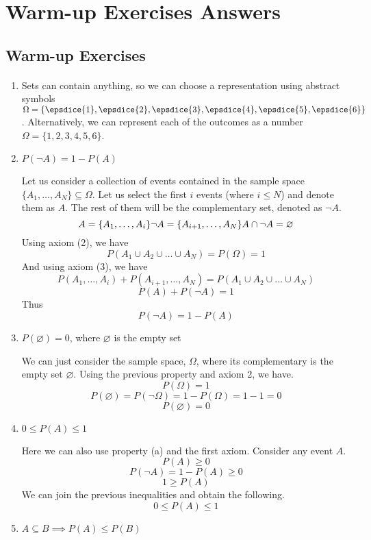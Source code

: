 \section{Warm-up Exercises Answers}
\subsection{Warm-up Exercises}
\paragraph{}
\begin{enumerate}[label=\alph*.]
    \item Sets can contain anything, so we can choose a representation using abstract symbols $\Omega=\{ \epsdice{1}, \epsdice{2}, \epsdice{3}, \epsdice{4}, \epsdice{5}, \epsdice{6} \}$. Alternatively, we can represent each of the outcomes as a number $\Omega = \{1, 2, 3, 4, 5, 6\}$. 
    \item $P(\neg  A) = 1 - P(A)$
    
Let us consider a collection of events contained in the sample space $\{A_1, \dots, A_{N}\} \subseteq \Omega$. Let us select the first $i$ events (where $i\leq N$) and denote them as $A$. The rest of them will be the complementary set, denoted as $\neg A$.
\[
A = \{A_1, \dots, A_i\}\\
\neg A = \{A_{i+1}, \dots, A_N\}\\
A\cap \neg A = \varnothing
\]
Using axiom (2), we have
\[
P(A_1\cup A_2 \cup \dots \cup A_N) = P(\Omega) = 1
\]
And using axiom (3), we have
\[
P(A_1, \dots, A_i) + P(A_{i+1}, \dots, A_N) = P(A_1\cup A_2 \cup \dots \cup A_N)
\]
\[
P(A) + P(\neg A) = 1
\]
Thus
\[
P(\neg A) = 1 - P(A) 
\]
    \item $P(\varnothing) = 0$, where $\varnothing$ is the empty set
    
We can just consider the sample space, $\Omega$, where its complementary is the empty set $\varnothing$. Using the previous property and axiom 2, we have.
\[
P(\Omega) = 1
\]
\[
 P(\varnothing)  = P(\neg \Omega) = 1 - P(\Omega) = 1 - 1 = 0
\]
\[
 P(\varnothing) = 0
\]
    \item $0 \leq P(A) \leq 1$
    
Here we can also use property (a) and the first axiom. Consider any event $A$.
\[
P(A) \geq 0
\]
\[
P(\neg A) = 1 - P(A) \geq 0
\]
\[
1 \geq P(A)
\]
We can join the previous inequalities and obtain the following.
\[
0 \leq P(A) \leq 1
\]
    \item $A \subseteq B \implies P(A) \leq P(B)$
    

\end{enumerate}
